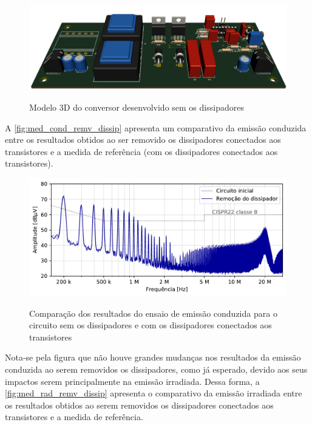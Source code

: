     \begin{figure}[H]
    	\centering
    	\caption{Modelo 3D do conversor desenvolvido sem os dissipadores}
    	\includegraphics[scale=.35]{pdf/fotos/tecnica_dissipador.png}
        \label{fig:3d_tecnica_dissipador}
    \end{figure}
    
    A \autoref{fig:med_cond_remv_dissip} apresenta um comparativo da emissão conduzida entre os resultados obtidos ao ser removido os dissipadores conectados aos transistores e a medida de referência (com os dissipadores conectados aos transistores). 
    
    \begin{figure}[H]
    	\centering
    	\caption{Comparação dos resultados do ensaio de emissão conduzida para o circuito sem os dissipadores e com os dissipadores conectados aos transistores}
    	\includegraphics[scale=.9]{pdf/cond/Remoção do dissipador.pdf}
    	\label{fig:med_cond_remv_dissip}
    \end{figure}
    
    Nota-se pela figura que não houve grandes mudanças nos resultados da emissão conduzida ao serem removidos os dissipadores, como já esperado, devido aos seus impactos serem principalmente na emissão irradiada. Dessa forma, a \autoref{fig:med_rad_remv_dissip} apresenta o comparativo da emissão irradiada entre os resultados obtidos ao serem removidos os dissipadores conectados aos transistores e a medida de referência. 
    
